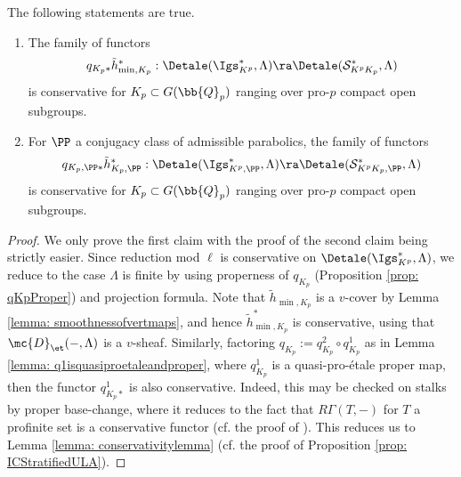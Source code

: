 \documentclass[letterpaper,11pt]{amsart}
\begin{document}
\begin{lemma}{\label{lemma: appliedconservativitycriterion}}
The following statements are true. 
\begin{enumerate}
\item The family of functors 
\[ q_{K_{p}*}\tilde{h}_{\min,K_{p}}^{*}: \Detale(\Igs^{*}_{K^{p}},\Lambda) \ra \Detale(\mathcal{S}^{*}_{K^{p}K_{p}},\Lambda) \]
is conservative for $K_{p} \subset G(\bb{Q}_{p})$ ranging over pro-$p$ compact open subgroups.
\item For $\PP$ a conjugacy class of admissible parabolics, the family of functors 
\[ q_{K_{p},\PP*}\tilde{h}_{K_{p},\PP}^{*}: \Detale(\Igs^{*}_{K^{p},\PP},\Lambda) \ra \Detale(\mathcal{S}^{*}_{K^{p}K_{p},\PP},\Lambda) \]
is conservative for $K_{p} \subset G(\bb{Q}_{p})$ ranging over pro-$p$ compact open subgroups.
\end{enumerate}
\end{lemma}
\begin{proof}
We only prove the first claim with the proof of the second claim being strictly easier. Since reduction mod $\ell$ is conservative on $\Detale(\Igs_{K^p}^\ast,\Lambda)$, we reduce to the case $\Lambda$ is finite by using properness of $q_{K_{p}}$ (Proposition \ref{prop: qKpProper}) and projection formula. Note that $\tilde{h}_{\min,K_{p}}$ is a $v$-cover by Lemma \ref{lemma: smoothnessofvertmaps}, and hence $\tilde{h}_{\min,K_{p}}^\ast$ is conservative, using that $\mc{D}_{\et}(-,\Lambda)$ is a $v$-sheaf. Similarly, factoring $q_{K_{p}} := q^{2}_{K_{p}} \circ q^{1}_{K_{p}}$ as in Lemma \ref{lemma: q1isquasiproetaleandproper}, where $q^{1}_{K_{p}}$ is a quasi-pro-\'etale proper map, then the functor $q^{1}_{K_{p}*}$ is also conservative. Indeed, this may be checked on stalks by proper base-change, where it reduces to the fact that $R\Gamma(T,-)$ for $T$ a profinite set is a conservative functor (cf. the proof of \cite[Proposition~IV.2.28]{FSGeomLLC}). This reduces us to Lemma \ref{lemma: conservativitylemma} (cf. the proof of Proposition \ref{prop: ICStratifiedULA}).
\end{proof}
\end{document}
